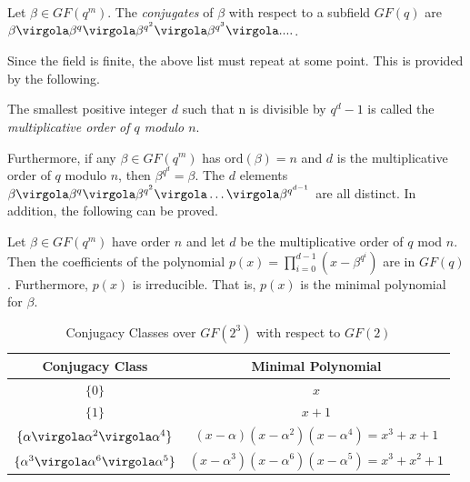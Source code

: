 \begin{Def}
Let $\beta \in GF(q^m)$. The \emph{conjugates} of \(\beta\) with respect to a subfield \(GF(q)\) are \( \beta \virgola \beta^q \virgola \beta^{q^2} \virgola \beta^{q^3} \virgola .... \).
\end{Def}
Since the field is finite, the above list must repeat at some point. This is provided by the following.
\begin{Def}
The smallest positive integer \(d\) such that n is divisible by \(q^d-1\) is called the \emph{multiplicative order of \(q\) modulo \(n\)}.
\end{Def}
Furthermore, if any \(\beta \in GF(q^m)\) has \( \mathrm{ord}(\beta)=n\) and \(d\) is the multiplicative order of \(q\) modulo \(n\), then \(\beta^{q^d} = \beta\). The \(d\) elements
\( \beta \virgola \beta^q \virgola \beta^{q^2}  \virgola \ldots \virgola \beta^{q^{d-1}} \)
are all distinct. In addition, the following can be proved.

\begin{Theorem} 
Let \(\beta \in GF(q^m) \) have order \(n\) and let \(d\) be the multiplicative order of \(q\) mod \(n\). Then the coefficients of the polynomial
\(p(x)=\prod_{i=0}^{d-1}{(x-\beta^{q^i})} \)
are in $GF(q)$. Furthermore, $p(x)$ is irreducible. That is, \(p(x)\) is the minimal polynomial for \(\beta\).
\end{Theorem}

\begin{table}\centering
\begin{tabular}{c| c}
Conjugacy Class & Minimal Polynomial\\
\hline
\(\{ 0\}\) & \(x\) \\
\(\{ 1\}\) & \(x+1\) \\
\(\{ \alpha \virgola \alpha^2 \virgola \alpha^4 \}\) &
\( (x-\alpha)(x-\alpha^2)(x-\alpha^4)= x^3+x+1 \) \\
\(\{ \alpha^3 \virgola \alpha^6 \virgola \alpha^5 \}\) &
\( (x-\alpha^3)(x-\alpha^6)(x-\alpha^5)= x^3+x^2+1 \)
\end{tabular}
\caption{ Conjugacy Classes over \(GF(2^3)\) with respect to \(GF(2)\) \label{tb:MinPoly3}}
\end{table}

